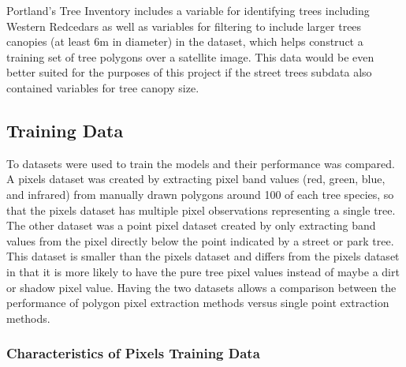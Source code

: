 \documentclass[12pt,twoside]{reedthesis}
\begin{document}
Portland's Tree Inventory includes a variable for identifying trees including Western Redcedars as well as variables for filtering to include larger trees canopies (at least 6m in diameter) in the dataset, which helps construct a training set of tree polygons over a satellite image. This data would be even better suited for the purposes of this project if the street trees subdata also contained variables for tree canopy size.

\hypertarget{training-data}{%
\subsection{Training Data}\label{training-data}}

To datasets were used to train the models and their performance was compared. A pixels dataset was created by extracting pixel band values (red, green, blue, and infrared) from manually drawn polygons around 100 of each tree species, so that the pixels dataset has multiple pixel observations representing a single tree. The other dataset was a point pixel dataset created by only extracting band values from the pixel directly below the point indicated by a street or park tree. This dataset is smaller than the pixels dataset and differs from the pixels dataset in that it is more likely to have the pure tree pixel values instead of maybe a dirt or shadow pixel value. Having the two datasets allows a comparison between the performance of polygon pixel extraction methods versus single point extraction methods.

\hypertarget{characteristics-of-pixels-training-data}{%
\subsubsection{Characteristics of Pixels Training Data}\label{characteristics-of-pixels-training-data}}
\end{document}
